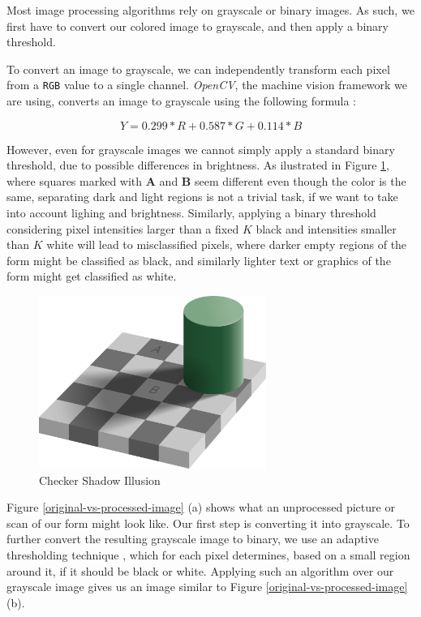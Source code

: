 \documentclass[11pt, a4paper]{report}
\def\code#1{\texttt{#1}}
\begin{document}
Most image processing algorithms rely on grayscale or binary images. As such, we first have to convert our colored image to grayscale, and then apply a binary threshold.

To convert an image to grayscale, we can independently transform each pixel from a \code{RGB} value to a single channel. \textit{OpenCV}, the machine vision framework we are using, converts an image to grayscale using the following formula \cite{opencv-color-convention}:

\[Y = 0.299*R+0.587*G+0.114*B\]

However, even for grayscale images we cannot simply apply a standard binary threshold, due to possible differences in brightness. 
As ilustrated in Figure \ref{checker-illusion}, where squares marked with \textbf{A} and \textbf{B} seem different even though the color is the same, separating dark and light regions is not a trivial task, if we want to take into account lighing and brightness. Similarly, applying a binary threshold considering pixel intensities larger than a fixed $K$ black and intensities smaller than $K$ white will lead to misclassified pixels, where darker empty regions of the form might be classified as black, and similarly lighter text or graphics of the form might get classified as white.

\begin{figure}[!h]
	\centering
	\includegraphics[width=20em]{images/other/Checker_shadow_illusion.svg.png}
	\caption{Checker Shadow Illusion \cite{checker-illusion}}
	\label{checker-illusion}
\end{figure}

Figure \ref{original-vs-processed-image} (a) shows what an unprocessed picture or scan of our form might look like. Our first step is converting it into grayscale. 
To further convert the resulting grayscale image to binary, we use an adaptive thresholding technique \cite{opencv-image-threshold}, which for each pixel determines, based on a small region around it, if it should be black or white. Applying such an algorithm over our grayscale image gives us an image similar to Figure \ref{original-vs-processed-image} (b).
\end{document}
